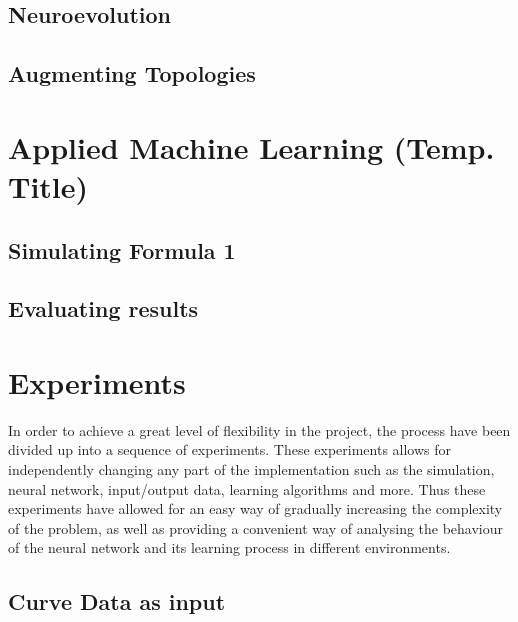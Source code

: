 \subsection{Neuroevolution}


\subsection{Augmenting Topologies}


\section{Applied Machine Learning (Temp. Title)}

\subsection{Simulating Formula 1}



\subsection{Evaluating results}

\section{Experiments}
In order to achieve a great level of flexibility in the project, the process have been divided up into a sequence of experiments. These experiments allows for independently changing any part of the implementation such as the simulation, neural network, input/output data, learning algorithms and more. Thus these experiments have allowed for an easy way of gradually increasing the complexity of the problem, as well as providing a convenient way of analysing the behaviour of the neural network and its learning process in different environments.


\subsection{Curve Data as input}



